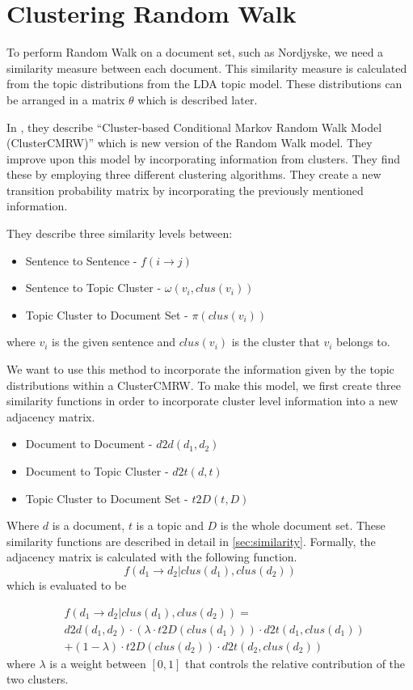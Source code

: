 \section{Clustering Random Walk}
To perform Random Walk on a document set, such as Nordjyske, we need a similarity measure between each document.
This similarity measure is calculated from the topic distributions from the LDA topic model.
These distributions can be arranged in a matrix $\theta$ which is described later.

In \cite{ClusterPageRank}, they describe ``Cluster-based Conditional Markov Random Walk Model (ClusterCMRW)'' which is new version of the Random Walk model. They improve upon this model by incorporating information from clusters. 
They find these by employing three different clustering algorithms.
They create a new transition probability matrix by incorporating the previously mentioned information.

They describe three similarity levels between:
\begin{itemize}
    \item Sentence to Sentence - $f(i \rightarrow j)$
    \item Sentence to Topic Cluster - $\omega(v_i, clus(v_i))$
    \item Topic Cluster to Document Set - $\pi(clus(v_i))$
\end{itemize}
where $v_i$ is the given sentence and $clus(v_i)$ is the cluster that $v_i$ belongs to.

We want to use this method to incorporate the information given by the topic distributions within a ClusterCMRW. 
To make this model, we first create three similarity functions in order to incorporate cluster level information into a new adjacency matrix.
\begin{itemize}
    \item Document to Document - $d2d(d_1, d_2)$
    \item Document to Topic Cluster - $d2t(d,t)$
    \item Topic Cluster to Document Set - $t2D(t, D)$
\end{itemize}

\noindent
Where $d$ is a document, $t$ is a topic and $D$ is the whole document set.
These similarity functions are described in detail in \autoref{sec:similarity}.
Formally, the adjacency matrix is calculated with the following function.
$$ f(d_1 \rightarrow d_2 | clus(d_1), clus(d_2)) $$
which is evaluated to be 

\begin{align*}
&f(d_1 \rightarrow d_2 | clus(d_1), clus(d_2)) = \\
&d2d(d_1, d_2) \cdot (\lambda \cdot t2D(clus(d_1))) \cdot d2t(d_1, clus(d_1)) \\ 
&+ (1-\lambda) \cdot t2D(clus(d_2)) \cdot d2t(d_2, clus(d_2))
\end{align*}
where $\lambda$ is a weight between $[0,1]$ that controls the relative contribution of the two clusters.


